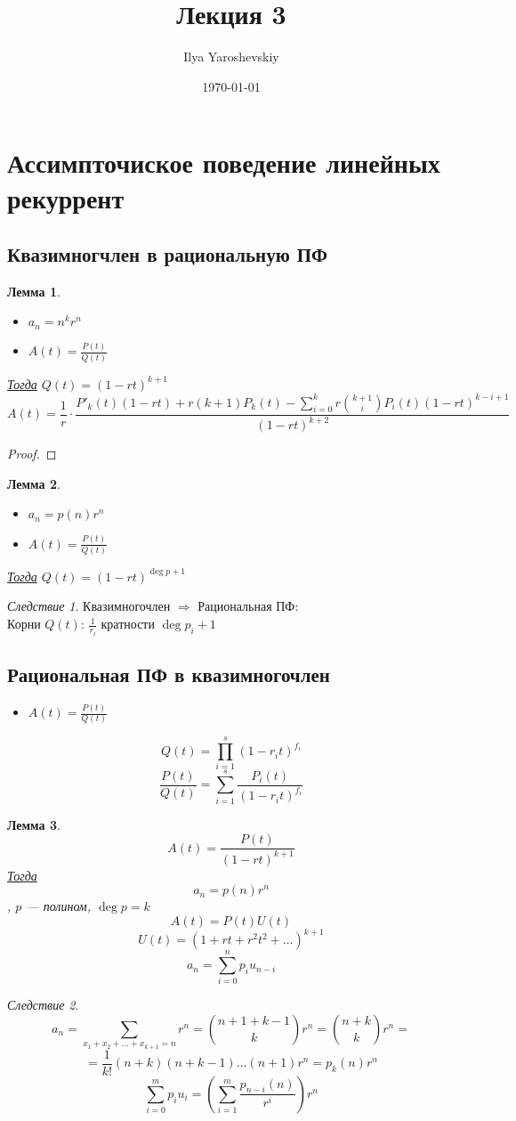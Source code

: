 \documentclass[english]{article}
\author{Ilya Yaroshevskiy}
\date{\today}
\title{Лекция 3}
\newcommand{\todo}{{\color{red}\fbox{\text{Доделать}}}}
\theoremstyle{plain}
\newtheorem{lemma}{Лемма}
\theoremstyle{remark}
\newtheorem{corollary}{Следствие}[theorem]
\theoremstyle{definition}
\begin{document}
\maketitle
\tableofcontents


\section{Ассимпточиское поведение линейных рекуррент}
\label{sec:orgb3333b6}
\subsection{Квазимногчлен в рациональную ПФ}
\label{sec:org25fc312}
\begin{lemma}
\-
\begin{itemize}
\item \(a_n = n^k r^n\)
\item \(A(t) = \frac{P(t)}{Q(t)}\)
\end{itemize}
\uline{Тогда} \(Q(t) = (1 - rt)^{k + 1}\)
\[ A(t) = \frac{1}{r}\cdot \frac{P'_k(t)(1 - rt) + r(k + 1)P_k(t) - \sum_{i = 0}^k r \binom{k + 1}{i} P_i(t) (1 - rt)^{k - i + 1}}{(1 - rt)^{k + 2}} \]
\end{lemma}
\begin{proof}
\todo
\end{proof}
\begin{lemma}
\-
\begin{itemize}
\item \(a_n = p(n) r^n\)
\item \(A(t) = \frac{P(t)}{Q(t)}\)
\end{itemize}
\uline{Тогда} \(Q(t) = (1 - rt)^{\deg p + 1}\)
\end{lemma}
\begin{corollary}
Квазимногочлен \(\Rightarrow\) Рациональная ПФ: \\
Корни \(Q(t)\): \(\frac{1}{r_i}\) кратности \(\deg p_i + 1\)
\end{corollary}

\subsection{Рациональная ПФ в квазимногочлен}
\label{sec:orgf2a4ea1}
\begin{itemize}
\item \(A(t) = \frac{P(t)}{Q(t)}\)
\end{itemize}
\[ Q(t) = \prod_{i = 1}^s (1 - r_it)^{f_i} \]
\[ \frac{P(t)}{Q(t)} = \sum_{i = 1}^s \frac{P_i(t)}{(1 - r_i t)^{f_i}} \]
\begin{lemma}
\[ A(t) = \frac{P(t)}{(1 - rt)^{k + 1}} \]
\uline{Тогда} \[ a_n = p(n) r^n \], \(p\) --- полином, \(\deg p = k\)
\[ A(t) = P(t) U(t) \]
\[ U(t) = (1 + rt + r^2 t^2 + \dots)^{k + 1} \]
\[ a_n = \sum_{i = 0}^n p_i u_{n - i} \]
\end{lemma}
\begin{corollary}
\[ a_n = \sum_{x_1 + x_2 + \dots + x_{k + 1} = n} r^n = \binom{n + 1 + k - 1}{k}r^n = \binom{n + k}{k}r^n = \]
\[ = \frac{1}{k!}(n + k)(n + k - 1)\dots(n + 1)r^n = p_k(n)r^n \]
\[ \sum_{i = 0}^m p_i u_i = \left(\sum_{i = 1}^m \frac{p_{n - i}(n)}{r^i}\right)r^n \]
\end{corollary}
\end{document}
